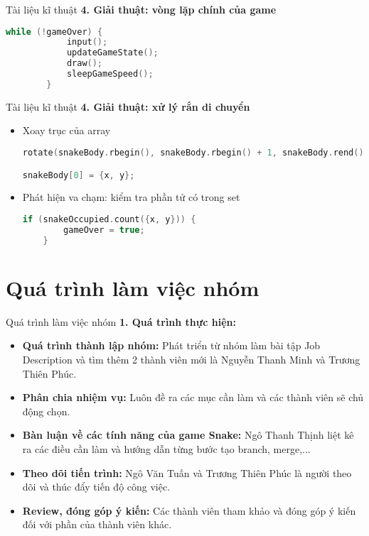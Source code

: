 \documentclass{beamer}
\begin{document}
\begin{frame}[fragile]{Tài liệu kĩ thuật}
    \textbf{4. Giải thuật: vòng lặp chính của game}
    \begin{lstlisting}[language=C++]
        while (!gameOver) {
            input();
            updateGameState();
            draw();
            sleepGameSpeed();
        }
    \end{lstlisting}
\end{frame}

\begin{frame}[fragile]{Tài liệu kĩ thuật}
    \textbf{4. Giải thuật: xử lý rắn di chuyển}
    \begin{itemize}
        \item Xoay trục của array
\begin{footnotesize}
              \begin{lstlisting}[language=C++]
rotate(snakeBody.rbegin(), snakeBody.rbegin() + 1, snakeBody.rend());

snakeBody[0] = {x, y};
    \end{lstlisting}
          \end{footnotesize}
          \item Phát hiện va chạm: kiểm tra phần tử có trong set
\begin{footnotesize}
              \begin{lstlisting}[language=C++]
    if (snakeOccupied.count({x, y})) {
        gameOver = true;
    }
    \end{lstlisting}
          \end{footnotesize}
    \end{itemize}
\end{frame}

\section{Quá trình làm việc nhóm}
\begin{frame}{Quá trình làm việc nhóm}
    \textbf{1. Quá trình thực hiện:}
    \begin{itemize}
        \item \textbf{Quá trình thành lập nhóm:} Phát triển từ nhóm làm bài tập Job Description và tìm thêm 2 thành viên mới là Nguyễn Thanh Minh và Trương Thiên Phúc.
        \item \textbf{Phân chia nhiệm vụ:} Luôn đề ra các mục cần làm và các thành viên sẽ chủ động chọn.
        \item \textbf{Bàn luận về các tính năng của game Snake:} Ngô Thanh Thịnh liệt kê ra các điều cần làm và hướng dẫn từng bước tạo branch, merge,...
        \item \textbf{Theo dõi tiến trình:} Ngô Văn Tuấn và Trương Thiên Phúc là người theo dõi và thúc đẩy tiến độ công việc.
        \item \textbf{Review, đóng góp ý kiến:} Các thành viên tham khảo và đóng góp ý kiến đối với phần của thành viên khác.
    \end{itemize}
\end{frame}
\end{document}
